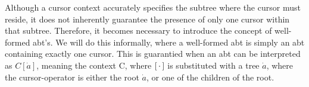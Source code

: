 \documentclass[sigplan,anonymous,review]{acmart}
\begin{document}

Although a cursor context accurately specifies the subtree where the cursor must reside, it does not inherently guarantee the presence of only one cursor within that subtree. Therefore, it becomes necessary to introduce the concept of well-formed abt's. We will do this informally, where a well-formed abt is simply an abt containing exactly one cursor. This is guarantied when an abt can be interpreted as $C[\dot{a}]$, meaning the context C, where $[ \, \cdot \, ]$ is substituted with a tree $\dot{a}$, where the cursor-operator is either the root $\dot{a}$, or one of the children of the root.
\end{document}
